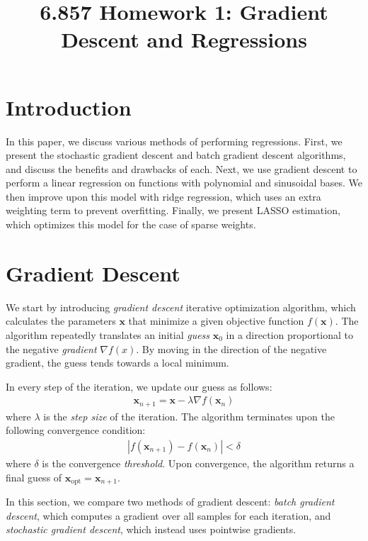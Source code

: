 \documentclass[10pt]{paper}
\title{6.857 Homework 1: Gradient Descent and Regressions}
\begin{document}
\maketitle
\section{Introduction}

In this paper, we discuss various methods of performing regressions. First, we present the stochastic gradient descent and batch gradient descent algorithms, and discuss the benefits and drawbacks of each. Next, we use gradient descent to perform a linear regression on functions with polynomial and sinusoidal bases. We then improve upon this model with ridge regression, which uses an extra weighting term to prevent overfitting. Finally, we present LASSO estimation, which optimizes this model for the case of sparse weights. 

\section{Gradient Descent}

We start by introducing \emph{gradient descent} iterative optimization algorithm, which calculates the parameters $\mathbf{x}$ that minimize a given objective function $f(\mathbf{x})$. The algorithm repeatedly translates an initial \emph{guess} $\mathbf{x}_0$ in a direction proportional to the negative \emph{gradient} $\nabla f(x)$. By moving in the direction of the negative gradient, the guess tends towards a local minimum.

In every step of the iteration, we update our guess as follows:
\begin{align*}
\mathbf{x}_{n+1} = \mathbf{x} - \lambda \nabla f(\mathbf{x}_{n})
\end{align*}
where $\lambda$ is the \emph{step size} of the iteration. The algorithm terminates upon the following convergence condition: 
\begin{align*}
|f(\mathbf{x}_{n+1}) - f(\mathbf{x}_{n})| < \delta
\end{align*}
where $\delta$ is the convergence \emph{threshold}. Upon convergence, the algorithm returns a final guess of $\mathbf{x}_{\text{opt}} = \mathbf{x}_{n+1}$.

In this section, we compare two methods of gradient descent: \emph{batch gradient descent}, which computes a gradient over all samples for each iteration, and \emph{stochastic gradient descent}, which instead uses pointwise gradients.
\end{document}
